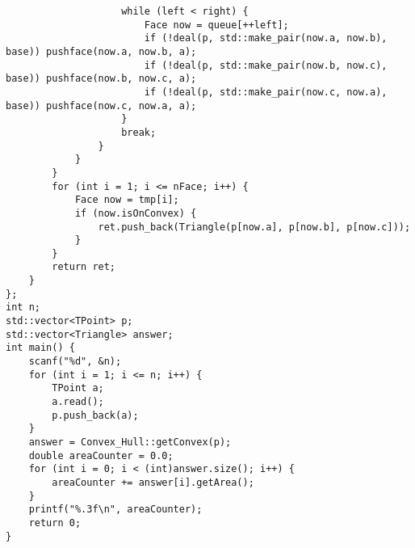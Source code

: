 \begin{lstlisting}
					while (left < right) {
						Face now = queue[++left];
						if (!deal(p, std::make_pair(now.a, now.b), base)) pushface(now.a, now.b, a);
						if (!deal(p, std::make_pair(now.b, now.c), base)) pushface(now.b, now.c, a);
						if (!deal(p, std::make_pair(now.c, now.a), base)) pushface(now.c, now.a, a);
					}
					break;
				}
			}
		}
		for (int i = 1; i <= nFace; i++) {
			Face now = tmp[i];
			if (now.isOnConvex) {
				ret.push_back(Triangle(p[now.a], p[now.b], p[now.c]));
			}
		}
		return ret;
	}
};
int n;
std::vector<TPoint> p;
std::vector<Triangle> answer;
int main() {
	scanf("%d", &n);
	for (int i = 1; i <= n; i++) {
		TPoint a;
		a.read();
		p.push_back(a);
	}
	answer = Convex_Hull::getConvex(p);
	double areaCounter = 0.0;
	for (int i = 0; i < (int)answer.size(); i++) {
		areaCounter += answer[i].getArea();
	}
	printf("%.3f\n", areaCounter);
	return 0;
}
\end{lstlisting}
